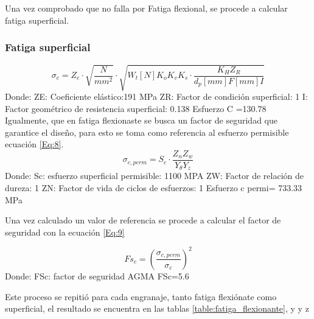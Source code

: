 Una vez comprobado que no falla por Fatiga flexional, se procede a calcular fatiga superficial.
\subsubsection*{Fatiga superficial}
\begin{equation}
 \sigma_{c}=Z_{e}\cdot \sqrt{\frac{N}{mm^{2}}} \cdot \sqrt{W_{t}[N]K_{o}K_{v}K_{s} \cdot \frac{K_{H}Z_{R}}{d_{p}[mm]F[mm]I}}
\label{Eq:7}    
\end{equation}
Donde: 
ZE: Coeficiente elástico:191 MPa
ZR: Factor de condición superficial: 1
I: Factor geométrico de resistencia superficial:  0.138
Esfuerzo C =130.78
Igualmente, que en fatiga flexionaste se busca un factor de seguridad que garantice el diseño, para esto se toma como referencia al esfuerzo permisible ecuación \ref{Eq:8}.
\begin{equation}
    \sigma_{c,perm}=S_{c}\cdot \frac{Z_{n}Z_{w}}{Y_{\theta}Y_{z}}
    \label{Eq:8}
\end{equation}
Donde: 
Sc: esfuerzo superficial permisible: 1100 MPA
ZW: Factor de relación de dureza: 1
ZN: Factor de vida de ciclos de esfuerzos: 1
Esfuerzo c permi= 733.33 MPa

Una vez calculado un valor de referencia se procede a calcular el factor de seguridad con la ecuación \ref{Eq:9}

\begin{equation}
    Fs_{c}=(\frac{\sigma_{c,perm}}{\sigma_{c}})^{2}
    \label{Eq:9}
\end{equation}
Donde:
FSc: factor de seguridad AGMA
FSc=5.6

Este proceso se repitió para cada engranaje, tanto fatiga flexiónate como superficial, el resultado se encuentra en las tablas \ref{table:fatiga_flexionante}, y y z






